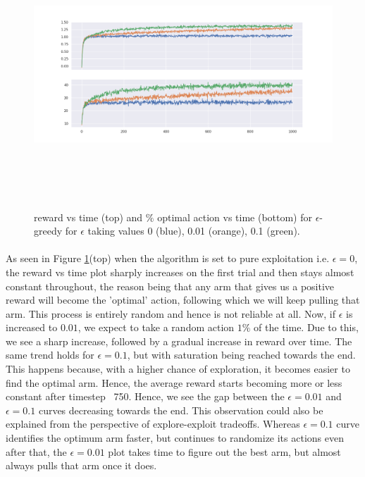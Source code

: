 \documentclass[12pt]{extarticle}
\begin{document}
\begin{figure}[h]
	\includegraphics[width=\textwidth, height=10cm]{epsilon-greedy.png}
	\caption{reward vs time (top) and $\%$ optimal action vs time (bottom) for $\epsilon$-greedy for $\epsilon$ taking values 0 (blue), 0.01 (orange), 0.1 (green).}
	\label{fig:epsilon-greedy}
\end{figure}

\paragraph{} As seen in Figure \ref{fig:epsilon-greedy}(top) when the algorithm is set to pure exploitation i.e. $\epsilon = 0$, the reward vs time plot sharply increases on the first trial and then stays almost constant throughout, the reason being that any arm that gives us a positive reward will become the 'optimal' action, following which we will keep pulling that arm. This process is entirely random and hence is not reliable at all. Now, if $\epsilon$ is increased to $0.01$, we expect to take a random action $1\%$ of the time. Due to this, we see a sharp increase, followed by a gradual increase in reward over time. The same trend holds for $\epsilon = 0.1$, but with saturation being reached towards the end. This happens because, with a higher chance of exploration, it becomes easier to find the optimal arm. Hence, the average reward starts becoming more or less constant after timestep ~750. Hence, we see the gap between the $\epsilon=0.01$ and $\epsilon=0.1$ curves decreasing towards the end. This observation could also be explained from the perspective of explore-exploit tradeoffs. Whereas $\epsilon=0.1$ curve identifies the optimum arm faster, but continues to randomize its actions even after that, the $\epsilon=0.01$ plot takes time to figure out the best arm, but almost always pulls that arm once it does.
\end{document}
